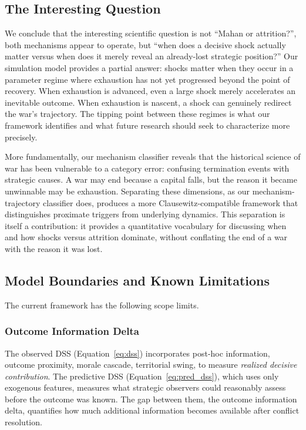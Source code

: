 \subsection{The Interesting Question}

We conclude that the interesting scientific question is not ``Mahan or attrition?'', both mechanisms appear to operate, but ``when does a decisive shock actually matter versus when does it merely reveal an already-lost strategic position?'' Our simulation model provides a partial answer: shocks matter when they occur in a parameter regime where exhaustion has not yet progressed beyond the point of recovery. When exhaustion is advanced, even a large shock merely accelerates an inevitable outcome. When exhaustion is nascent, a shock can genuinely redirect the war's trajectory. The tipping point between these regimes is what our framework identifies and what future research should seek to characterize more precisely.

More fundamentally, our mechanism classifier reveals that the historical science of war has been vulnerable to a category error: confusing termination events with strategic causes. A war may end because a capital falls, but the reason it became unwinnable may be exhaustion. Separating these dimensions, as our mechanism-trajectory classifier does, produces a more Clausewitz-compatible framework that distinguishes proximate triggers from underlying dynamics. This separation is itself a contribution: it provides a quantitative vocabulary for discussing when and how shocks versus attrition dominate, without conflating the end of a war with the reason it was lost.

\subsection{Model Boundaries and Known Limitations}

The current framework has the following scope limits.

\subsubsection{Outcome Information Delta}

The observed DSS (Equation~\ref{eq:dss}) incorporates post-hoc information, outcome proximity, morale cascade, territorial swing, to measure \emph{realized decisive contribution}. The predictive DSS (Equation~\ref{eq:pred_dss}), which uses only exogenous features, measures what strategic observers could reasonably assess before the outcome was known. The gap between them, the outcome information delta, quantifies how much additional information becomes available after conflict resolution.

